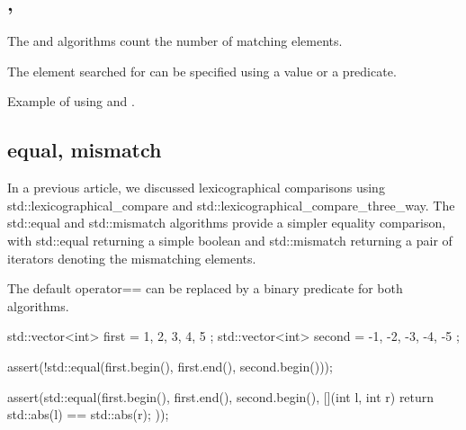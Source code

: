\subsection{\texorpdfstring{, }{\texttt{std::count}, \texttt{std::count\_if}}}

The  and  algorithms count the number of matching elements.


The element searched for can be specified using a value or a predicate.

\begin{box-note}
\footnotesize Example of using  and .
\tcblower
{}
\end{box-note}

\subsection{equal, mismatch}

In a previous article, we discussed lexicographical comparisons using std::lexicographical\_compare and std::lexicographical\_compare\_three\_way. The std::equal and std::mismatch algorithms provide a simpler equality comparison, with std::equal returning a simple boolean and std::mismatch returning a pair of iterators denoting the mismatching elements.



The default operator== can be replaced by a binary predicate for both algorithms.

\begin{box-note}
\begin{cppcode}
std::vector<int> first = { 1, 2, 3, 4, 5 };
std::vector<int> second = { -1, -2, -3, -4, -5 };

assert(!std::equal(first.begin(), first.end(), second.begin()));

assert(std::equal(first.begin(), first.end(), second.begin(), 
                  [](int l, int r) { return std::abs(l) == std::abs(r); }));
\end{cppcode}
\end{box-note}

